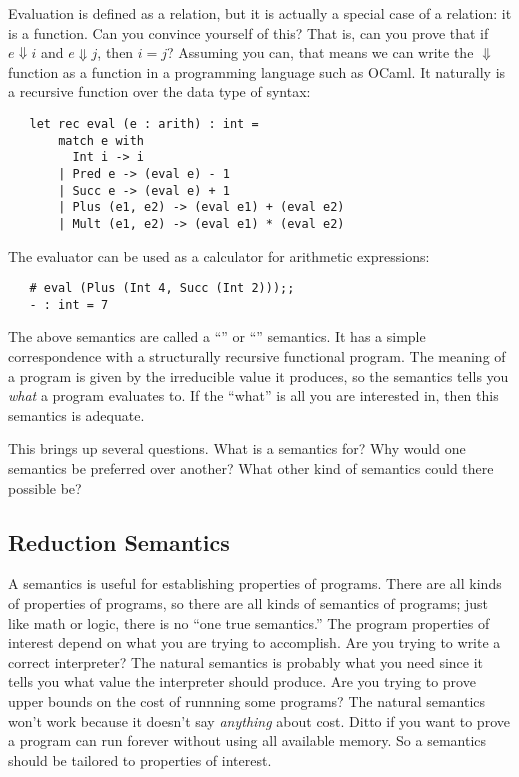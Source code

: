 Evaluation is defined as a relation, but it is actually a special case
of a relation: it is a function.  Can you convince yourself of this?
That is, can you prove that if $e \Downarrow i$ and $e \Downarrow j$,
then $i=j$?  Assuming you can, that means we can write the
$\Downarrow$ function as a function in a programming language such as
OCaml.  It naturally is a recursive function over the data type of
syntax:
\begin{verbatim}
   let rec eval (e : arith) : int = 
       match e with
         Int i -> i
       | Pred e -> (eval e) - 1
       | Succ e -> (eval e) + 1        
       | Plus (e1, e2) -> (eval e1) + (eval e2)
       | Mult (e1, e2) -> (eval e1) * (eval e2)
\end{verbatim}

The evaluator can be used as a calculator for arithmetic expressions:
\begin{verbatim}
   # eval (Plus (Int 4, Succ (Int 2)));;
   - : int = 7
\end{verbatim}

The above semantics are called a ``'' or ``''
semantics.  It has a simple correspondence with a structurally
recursive functional program.
The meaning of a program is given by the irreducible value it
produces, so the semantics tells you \emph{what} a program evaluates
to.  If the ``what'' is all you are interested in, then this semantics
is adequate.

This brings up several questions.  What is a semantics for?  Why would
one semantics be preferred over another?  What other kind of semantics
could there possible be?

\subsection{Reduction Semantics}

A semantics is useful for establishing properties of programs.  There
are all kinds of properties of programs, so there are all kinds of
semantics of programs; just like math or logic, there is no ``one true
semantics.''  The program properties of interest depend on what you
are trying to accomplish.  Are you trying to write a correct
interpreter?  The natural semantics is probably what you need since it
tells you what value the interpreter should produce.  Are you trying
to prove upper bounds on the cost of runnning some programs?  The
natural semantics won't work because it doesn't say \emph{anything}
about cost.  Ditto if you want to prove a program can run forever
without using all available memory.  So a semantics should be tailored
to properties of interest.

